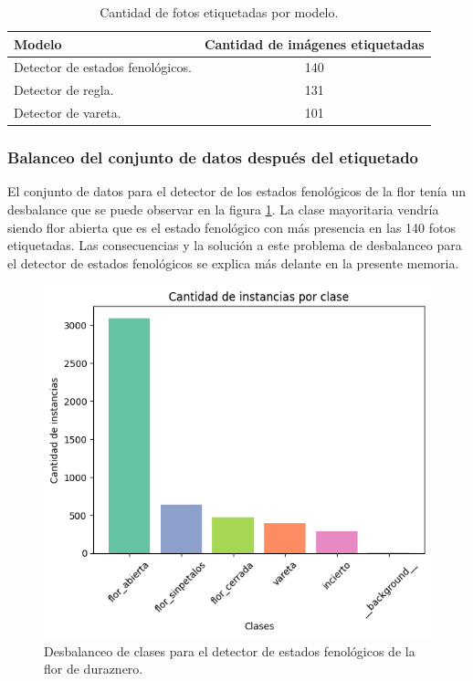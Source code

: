 \begin{table}[h]
	\centering
	\caption{Cantidad de fotos etiquetadas por modelo.}
	\begin{tabular}{l c }    
		\toprule
		\textbf{Modelo}     & \textbf{Cantidad de imágenes etiquetadas} \\
		\midrule
		Detector de estados fenológicos.                  & 140 \\
		Detector de regla.                  & 131 \\
		Detector de vareta.                  & 101 \\		
		\bottomrule
		\hline
	\end{tabular}
	\label{tab:etiquetado}
\end{table}

\subsubsection{Balanceo del conjunto de datos después del etiquetado}

El conjunto de datos para el detector de los estados fenológicos de la flor tenía un desbalance que se puede observar en la figura \ref{fig:desbalanceoDeteccion}. La clase mayoritaria vendría siendo flor abierta que es el estado fenológico con más presencia en las 140 fotos etiquetadas. Las consecuencias y la solución a este problema de desbalanceo para el detector de estados fenológicos se explica más delante en la presente memoria.

\begin{figure}[ht]
	\centering
	\includegraphics[scale=.65]{./Figures/desbalanceo_detector.png}
	\caption{Desbalanceo de clases para el detector de estados fenológicos de la flor de duraznero.}
	\label{fig:desbalanceoDeteccion}
\end{figure}
\newpage

